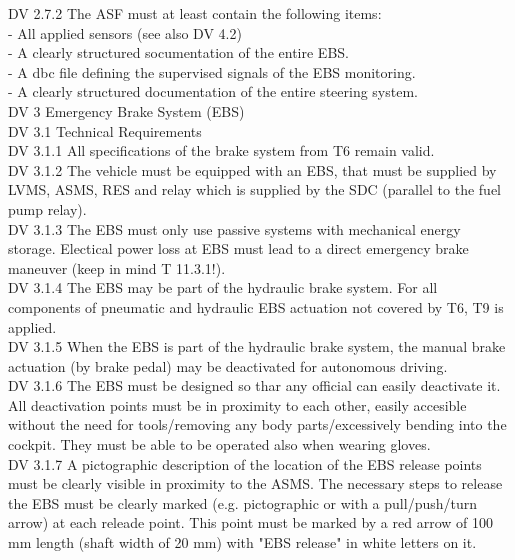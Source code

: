 \documentclass{article}
\begin{document}
DV 2.7.2 The ASF must at least contain the following items:\\
	- All applied sensors (see also DV 4.2)\\
	- A clearly structured socumentation of the entire EBS.\\
	- A dbc file defining the supervised signals of the EBS monitoring.\\
	- A clearly structured documentation of the entire steering system.\\
	
DV 3 Emergency Brake System (EBS)\\

DV 3.1 Technical Requirements\\

DV 3.1.1 All specifications of the brake system from T6 remain valid.\\

DV 3.1.2 The vehicle must be equipped with an EBS, that must be supplied by LVMS, ASMS, RES and relay which is supplied by the SDC (parallel to the fuel pump relay).\\

DV 3.1.3 The EBS must only use passive systems with mechanical energy storage. Electical power loss at EBS must lead to a direct emergency brake maneuver (keep in mind T 11.3.1!).\\

DV 3.1.4 The EBS may be part of the hydraulic brake system. For all components of pneumatic and hydraulic EBS actuation not covered by T6, T9 is applied.\\

DV 3.1.5 When the EBS is part of the hydraulic brake system, the manual brake actuation (by brake pedal) may be deactivated for autonomous driving.\\

DV 3.1.6 The EBS must be designed so thar any official can easily deactivate it. All deactivation points must be in proximity to each other, easily accesible without the need for tools/removing any body parts/excessively bending into the cockpit. They must be able to be operated also when wearing gloves.\\

DV 3.1.7 A pictographic description of the location of the EBS release points must be clearly visible in proximity to the ASMS. The necessary steps to release the EBS must be clearly marked (e.g. pictographic or with a pull/push/turn arrow) at each releade point. This point must be marked by a red arrow of 100 mm length (shaft width of 20 mm) with "EBS release" in white letters on it.\\
\end{document}
